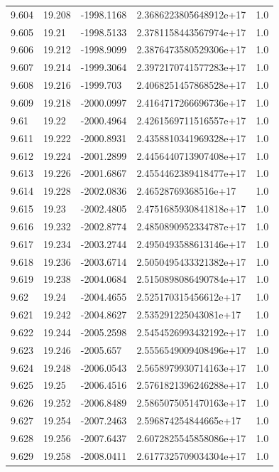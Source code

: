 \begin{tabular}{lllll}
9.604 & 19.208 & -1998.1168 & 2.3686223805648912e+17 & 1.0 \\
9.605 & 19.21 & -1998.5133 & 2.3781158443567974e+17 & 1.0 \\
9.606 & 19.212 & -1998.9099 & 2.3876473580529306e+17 & 1.0 \\
9.607 & 19.214 & -1999.3064 & 2.3972170741577283e+17 & 1.0 \\
9.608 & 19.216 & -1999.703 & 2.4068251457868528e+17 & 1.0 \\
9.609 & 19.218 & -2000.0997 & 2.4164717266696736e+17 & 1.0 \\
9.61 & 19.22 & -2000.4964 & 2.4261569711516557e+17 & 1.0 \\
9.611 & 19.222 & -2000.8931 & 2.4358810341969328e+17 & 1.0 \\
9.612 & 19.224 & -2001.2899 & 2.4456440713907408e+17 & 1.0 \\
9.613 & 19.226 & -2001.6867 & 2.4554462389418477e+17 & 1.0 \\
9.614 & 19.228 & -2002.0836 & 2.46528769368516e+17 & 1.0 \\
9.615 & 19.23 & -2002.4805 & 2.4751685930841818e+17 & 1.0 \\
9.616 & 19.232 & -2002.8774 & 2.4850890952334787e+17 & 1.0 \\
9.617 & 19.234 & -2003.2744 & 2.4950493588613146e+17 & 1.0 \\
9.618 & 19.236 & -2003.6714 & 2.5050495433321382e+17 & 1.0 \\
9.619 & 19.238 & -2004.0684 & 2.5150898086490784e+17 & 1.0 \\
9.62 & 19.24 & -2004.4655 & 2.525170315456612e+17 & 1.0 \\
9.621 & 19.242 & -2004.8627 & 2.535291225043081e+17 & 1.0 \\
9.622 & 19.244 & -2005.2598 & 2.5454526993432192e+17 & 1.0 \\
9.623 & 19.246 & -2005.657 & 2.5556549009408496e+17 & 1.0 \\
9.624 & 19.248 & -2006.0543 & 2.5658979930714163e+17 & 1.0 \\
9.625 & 19.25 & -2006.4516 & 2.5761821396246288e+17 & 1.0 \\
9.626 & 19.252 & -2006.8489 & 2.5865075051470163e+17 & 1.0 \\
9.627 & 19.254 & -2007.2463 & 2.596874254844665e+17 & 1.0 \\
9.628 & 19.256 & -2007.6437 & 2.6072825545858086e+17 & 1.0 \\
9.629 & 19.258 & -2008.0411 & 2.6177325709034304e+17 & 1.0 \\

\end{tabular}
